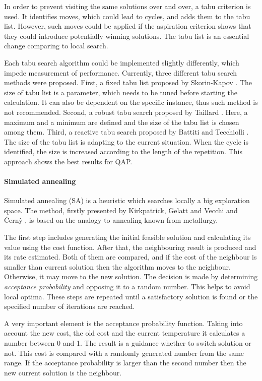 In order to prevent visiting the same solutions over and over, a tabu criterion is used.
It identifies moves, which could lead to cycles, and adds them to the tabu list.
However, such moves could be applied if the aspiration criterion shows that they could introduce potentially winning solutions.
The tabu list is an essential change comparing to local search.

Each tabu search algorithm could be implemented slightly differently, which impede measurement of performance.
Currently, three different tabu search methods were proposed.
First, a fixed tabu list proposed by Skorin-Kapov \cite{skorin1990tabu}.
The size of tabu list is a parameter, which needs to be tuned before starting the calculation.
It can also be dependent on the specific instance, thus such method is not recommended.
Second, a robust tabu search proposed by Taillard \cite{taillard1991robust}.
Here, a maximum and a minimum are defined and the size of the tabu list is chosen among them.
Third, a reactive tabu search proposed by Battiti and Tecchiolli \cite{battiti1994reactive}.
The size of the tabu list is adapting to the current situation.
When the cycle is identified, the size is increased according to the length of the repetition.
This approach shows the best results for QAP.

\paragraph{Simulated annealing}

Simulated annealing (SA) is a heuristic which searches locally a big exploration space.
The method, firstly presented by Kirkpatrick, Gelatt and Vecchi \cite{kirkpatrick1983optimization} and {\v{C}}ern{\`y} \cite{vcerny1985thermodynamical}, is based on the analogy to annealing known from metallurgy.

The first step includes generating the initial feasible solution and calculating its value using the cost function.
After that, the neighbouring result is produced and its rate estimated.
Both of them are compared, and if the cost of the neighbour is smaller than current solution then the algorithm moves to the neighbour.
Otherwise, it may move to the new solution.
The decision is made by determining \textit{acceptance probability} and opposing it to a random number.
This helps to avoid local optima.
These steps are repeated until a satisfactory solution is found or the specified number of iterations are reached.

A very important element is the acceptance probability function.
Taking into account the new cost, the old cost and the current temperature it calculates a number between 0 and 1.
The result is a guidance whether to switch solution or not.
This cost is compared with a randomly generated number from the same range.
If the acceptance probability is larger than the second number then the new current solution is the neighbour.

